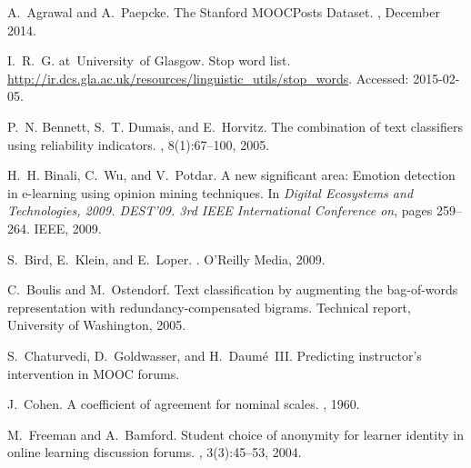 \documentclass{edm_template}
\begin{document}
%
%
%
\begin{thebibliography}{10}
A.~Agrawal and A.~Paepcke.
\newblock The {Stanford} {MOOCP}osts {Dataset}.
, December
  2014.

I.~R.~G. at~University~of Glasgow.
\newblock Stop word list.
\newblock \url{http://ir.dcs.gla.ac.uk/resources/linguistic_utils/stop_words}.
\newblock Accessed: 2015-02-05.

P.~N. Bennett, S.~T. Dumais, and E.~Horvitz.
\newblock The combination of text classifiers using reliability indicators.
, 8(1):67--100, 2005.

H.~H. Binali, C.~Wu, and V.~Potdar.
\newblock A new significant area: Emotion detection in e-learning using opinion
  mining techniques.
\newblock In {\em Digital Ecosystems and Technologies, 2009. DEST'09. 3rd IEEE
  International Conference on}, pages 259--264. IEEE, 2009.

S.~Bird, E.~Klein, and E.~Loper.
.
\newblock O'Reilly Media, 2009.

C.~Boulis and M.~Ostendorf.
\newblock Text classification by augmenting the bag-of-words representation
  with redundancy-compensated bigrams.
\newblock Technical report, University of Washington, 2005.

S.~Chaturvedi, D.~Goldwasser, and H.~Daum{\'e}~III.
\newblock Predicting instructor's intervention in {MOOC} forums.

J.~Cohen.
\newblock A coefficient of agreement for nominal scales.
, 1960.

M.~Freeman and A.~Bamford.
\newblock Student choice of anonymity for learner identity in online learning
  discussion forums.
, 3(3):45--53, 2004.


\end{thebibliography}
\end{document}
